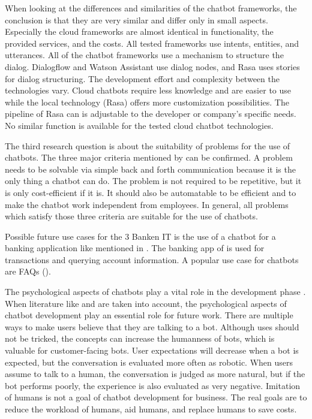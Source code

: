 When looking at the differences and similarities of the chatbot frameworks, the conclusion is that they are very similar and differ only in small aspects.
Especially the cloud frameworks are almost identical in functionality, the provided services, and the costs.
All tested frameworks use intents, entities, and utterances.
All of the chatbot frameworks use a mechanism to structure the dialog.
Dialogflow and Watson Assistant use dialog nodes, and Rasa uses stories for dialog structuring.
The development effort and complexity between the technologies vary.
Cloud chatbots require less knowledge and are easier to use while the local technology (Rasa) offers more customization possibilities.
The pipeline of Rasa can is adjustable to the developer or company's specific needs.
No similar function is available for the tested cloud chatbot technologies.

The third research question is about the suitability of problems for the use of chatbots.
The three major criteria mentioned by \citet{singhbuilding} can be confirmed.
A problem needs to be solvable via simple back and forth communication because it is the only thing a chatbot can do.
The problem is not required to be repetitive, but it is only cost-efficient if it is.
It should also be automatable to be efficient and to make the chatbot work independent from employees.
In general, all problems which satisfy those three criteria are suitable for the use of chatbots.

Possible future use cases for the 3 Banken IT is the use of a chatbot for a banking application like mentioned in \citet{singhbuilding}.
The banking app of \citet{singhbuilding} is used for transactions and querying account information.
A popular use case for chatbots are FAQs (\citet{evaluateChatbotsShawar2007, buiildChatbotsPython, huang2007extracting, GO2019304}).

The psychological aspects of chatbots play a vital role in the development phase \cite{GO2019304}.
When literature like \citet{folstad2017chatbots, brandtzaeg2018chatbots} and \citet{GO2019304} are taken into account, the psychological aspects of chatbot development play an essential role for future work.
There are multiple ways to make users believe that they are talking to a bot.
Although uses should not be tricked, the concepts can increase the humanness of bots, which is valuable for customer-facing bots.
User expectations will decrease when a bot is expected, but the conversation is evaluated more often as robotic.
When users assume to talk to a human, the conversation is judged as more natural, but if the bot performs poorly, the experience is also evaluated as very negative.
Imitation of humans is not a goal of chatbot development for business.
The real goals are to reduce the workload of humans, aid humans, and replace humans to save costs.


